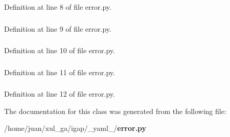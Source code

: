 Definition at line 8 of file error.py.
\subsubsection{}\label{class__yaml___1_1error_1_1Mark_6683b3755d2ad0ff7469286eab2f4c14}




Definition at line 9 of file error.py.
\subsubsection{}\label{class__yaml___1_1error_1_1Mark_df85b14c9b8262a5efc70761cc4f4296}




Definition at line 10 of file error.py.
\subsubsection{}\label{class__yaml___1_1error_1_1Mark_d1c324b4a223d30ac6ff0b75bffca4e1}




Definition at line 11 of file error.py.
\subsubsection{}\label{class__yaml___1_1error_1_1Mark_edf04d0410313abb4f7f7e1e7a6f4d1b}




Definition at line 12 of file error.py.

The documentation for this class was generated from the following file:\begin{CompactItemize}
\item 
/home/juan/xul\_\-ga/igap/\_\-yaml\_\-/{\bf error.py}\end{CompactItemize}
